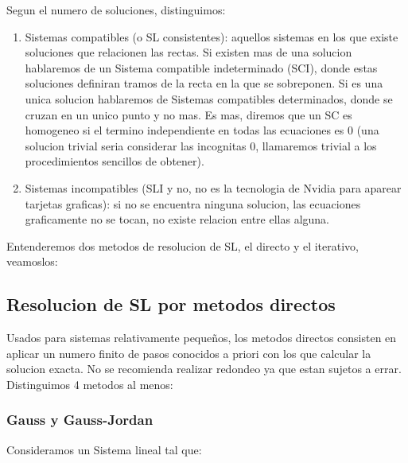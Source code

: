 \documentclass[11pt,a4paper]{article}
\begin{document}
Segun el numero de soluciones, distinguimos:

\begin{enumerate}
\item Sistemas compatibles (o SL consistentes): aquellos sistemas en los que existe soluciones que relacionen las rectas. Si existen mas de una solucion hablaremos de un Sistema compatible indeterminado (SCI), donde estas soluciones definiran tramos de la recta en la que se sobreponen. Si es una unica solucion hablaremos de Sistemas compatibles determinados, donde se cruzan en un unico punto y no mas. Es mas, diremos que un SC es homogeneo si el termino independiente en todas las ecuaciones es 0 (una solucion trivial seria considerar las incognitas 0, llamaremos trivial a los procedimientos sencillos de obtener).

\item Sistemas incompatibles (SLI y no, no es la tecnologia de Nvidia para aparear tarjetas graficas): si no se encuentra ninguna solucion, las ecuaciones graficamente no se tocan, no existe relacion entre ellas alguna. 
\end{enumerate}

Entenderemos dos metodos de resolucion de SL, el directo y el iterativo, veamoslos:

\subsection{Resolucion de SL por metodos directos}

Usados para sistemas relativamente pequeños, los metodos directos consisten en aplicar un numero finito de pasos conocidos a priori con los que calcular la solucion exacta. No se recomienda realizar redondeo ya que estan sujetos a errar. Distinguimos 4 metodos al menos:

\subsubsection{Gauss y Gauss-Jordan}

Consideramos un Sistema lineal tal que:
\end{document}
